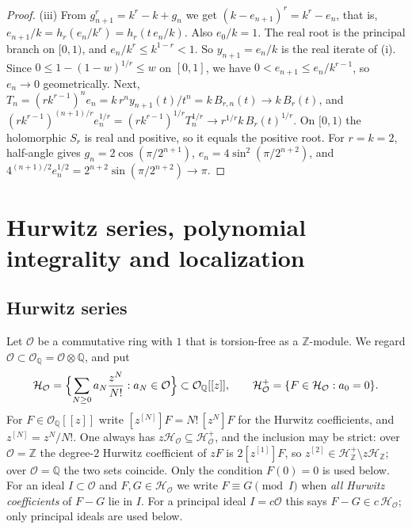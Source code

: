 \documentclass[11pt,reqno]{amsart}
\theoremstyle{definition}
\theoremstyle{remark}
\theoremstyle{plain}
\newcommand{\Z}{\mathbb Z}
\newcommand{\Q}{\mathbb Q}
\newcommand{\Hur}{\mathcal H}
\newcommand{\hc}[1]{[z^{[#1]}]}
\begin{document}
\begin{proof}
(iii) From $g_{n+1}^r=k^r-k+g_n$ we get $(k-e_{n+1})^r=k^r-e_n$, that is, $e_{n+1}/k=h_r(e_n/k^r)=h_r(t\,e_n/k)$. Also $e_0/k=1$. The real root is the principal branch on $[0,1)$, and $e_n/k^r\le k^{1-r}<1$. So $y_{n+1}=e_n/k$ is the real iterate of (i). Since $0\le1-(1-w)^{1/r}\le w$ on $[0,1]$, we have $0<e_{n+1}\le e_n/k^{r-1}$, so $e_n\to0$ geometrically. Next, $T_n=(rk^{r-1})^ne_n=k\,r^ny_{n+1}(t)/t^n=k\,B_{r,n}(t)\to k\,B_r(t)$, and $(rk^{r-1})^{(n+1)/r}e_n^{1/r}=(rk^{r-1})^{1/r}T_n^{1/r}\to r^{1/r}k\,B_r(t)^{1/r}$. On $[0,1)$ the holomorphic $S_r$ is real and positive, so it equals the positive root. For $r=k=2$, half-angle gives $g_n=2\cos(\pi/2^{n+1})$, $e_n=4\sin^2(\pi/2^{n+2})$, and $4^{(n+1)/2}e_n^{1/2}=2^{n+2}\sin(\pi/2^{n+2})\to\pi$.
\end{proof}

\section{Hurwitz series, polynomial integrality and localization}\label{sec:hurwitz}

\subsection{Hurwitz series}
Let $\mathcal O$ be a commutative ring with $1$ that is torsion-free as a $\Z$-module. We regard $\mathcal O\subset\mathcal O_\Q=\mathcal O\otimes\Q$, and put
\[
\Hur_{\mathcal O}=\Bigl\{\sum_{N\ge0}a_N\frac{z^N}{N!}:a_N\in\mathcal O\Bigr\}\subset\mathcal O_\Q[[z]],\qquad
\Hur^+_{\mathcal O}=\{F\in\Hur_{\mathcal O}:a_0=0\}.
\]
For $F\in\mathcal O_\Q[[z]]$ write $\hc NF=N!\,[z^N]F$ for the Hurwitz coefficients, and $z^{[N]}=z^N/N!$. One always has $z\Hur_{\mathcal O}\subseteq\Hur^+_{\mathcal O}$, and the inclusion may be strict: over $\mathcal O=\Z$ the degree-$2$ Hurwitz coefficient of $zF$ is $2\hc1F$, so $z^{[2]}\in\Hur^+_\Z\setminus z\Hur_\Z$; over $\mathcal O=\Q$ the two sets coincide. Only the condition $F(0)=0$ is used below. For an ideal $I\subset\mathcal O$ and $F,G\in\Hur_{\mathcal O}$ we write $F\equiv G\pmod I$ when \emph{all Hurwitz coefficients} of $F-G$ lie in $I$. For a principal ideal $I=c\mathcal O$ this says $F-G\in c\,\Hur_{\mathcal O}$; only principal ideals are used below.
\end{document}
